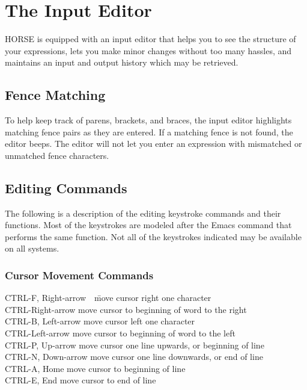 \section{The Input Editor}
\label{sec-edit}

	HORSE is equipped with an input editor that helps you to see the
structure of your expressions, lets you make minor changes without
too many hassles, and maintains an input and output history which may be
retrieved. 

\subsection{Fence Matching}
	To help keep track of parens, brackets, and braces,
the input editor highlights matching fence pairs as they are
entered.  If a matching fence is not found, the editor beeps.
The editor will not let you enter an expression with mismatched or
unmatched fence characters. 


\subsection{Editing Commands}

	The following is a description of the editing keystroke commands and their
functions.   Most of the keystrokes are modeled
after the Emacs command that performs the same function.
Not all of the keystrokes indicated
may be available on all systems. 

\subsubsection{Cursor Movement Commands}
\begin{tabbing}
CTRL-F, Right-arrow\ \   \=move cursor right one character\\
CTRL-Right-arrow \>move cursor to beginning of word to the right\\
CTRL-B, Left-arrow \>move cursor left one character\\
CTRL-Left-arrow \>move cursor to beginning of word to the left\\
CTRL-P, Up-arrow \>move cursor one line upwards, or beginning of line\\
CTRL-N, Down-arrow \>move cursor one line downwards, or end of line\\
CTRL-A, Home \>move cursor to beginning of line\\
CTRL-E, End \>move cursor to end of line
\end{tabbing}

